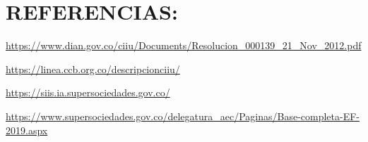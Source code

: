 \documentclass[
  11pt,
]{book}
\begin{document}
\hypertarget{referencias}{%
\chapter{REFERENCIAS:}\label{referencias}}

\url{https://www.dian.gov.co/ciiu/Documents/Resolucion_000139_21_Nov_2012.pdf}

\url{https://linea.ccb.org.co/descripcionciiu/}

\url{https://siis.ia.supersociedades.gov.co/}

\url{https://www.supersociedades.gov.co/delegatura_aec/Paginas/Base-completa-EF-2019.aspx}

\backmatter
\end{document}
